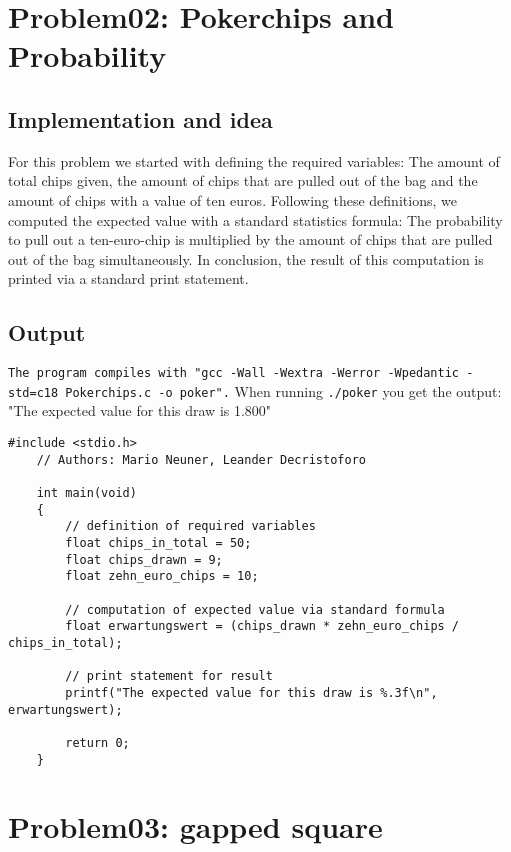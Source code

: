 \documentclass[12pt,a4paper]{article}
\begin{document}
\section{Problem02: Pokerchips and Probability}
\subsection{Implementation and idea}
For this problem we started with defining the required variables: The amount of total chips given, 
the amount of chips that are pulled out of the bag and the amount of chips with a value of ten euros. 
Following these definitions, we computed the expected value with a standard statistics formula: 
The probability to pull out a ten-euro-chip is multiplied by the amount of chips that are pulled out of 
the bag simultaneously. In conclusion, the result of this computation is printed via a standard print statement. 
\newline

\subsection{Output}
\texttt{The program compiles with "gcc -Wall -Wextra -Werror -Wpedantic -std=c18 Pokerchips.c -o poker".}
When running \texttt{./poker} you get the output: 
\newline
"The expected value for this draw is 1.800"

\begin{lstlisting}[caption={Pokerchips},label={lst:p7001}]
    #include <stdio.h>
    // Authors: Mario Neuner, Leander Decristoforo

    int main(void)
    {
        // definition of required variables
        float chips_in_total = 50;
        float chips_drawn = 9;
        float zehn_euro_chips = 10;

        // computation of expected value via standard formula
        float erwartungswert = (chips_drawn * zehn_euro_chips / chips_in_total);

        // print statement for result
        printf("The expected value for this draw is %.3f\n", erwartungswert);

        return 0;
    }
\end{lstlisting}

\vspace{10em}


\section{Problem03: gapped square}
\end{document}
